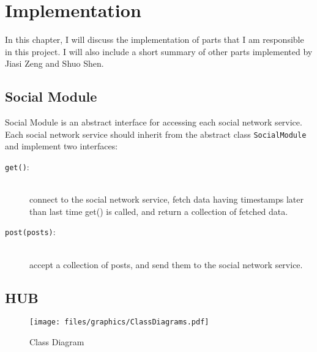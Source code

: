 %
%

\chapter{Implementation} %
\label{cha:implementation}

In this chapter, I will discuss the implementation of parts that I am responsible in this project. I will also include a short summary of other parts implemented by Jiasi Zeng and Shuo Shen.

\section{Social Module} %
\label{sec:social_module}

Social Module is an abstract interface for accessing each social network service. Each social network service should inherit from the abstract class \texttt{SocialModule} and implement two interfaces:
\begin{description}
	\item[\texttt{get()}:] \hfill \\ 
	connect to the social network service, fetch data having timestamps later than last time get() is called, and return a collection of fetched data.
	\item[\texttt{post(posts)}:] \hfill \\
	 accept a collection of posts, and send them to the social network service.
\end{description}


\section{HUB} %
\label{sec:hub}

\begin{figure}[htbp]
	\centering
		\texttt{[image: files/graphics/ClassDiagrams.pdf]}
	\caption{Class Diagram}
	\label{fig:graphics_ClassDiagrams}
\end{figure}

